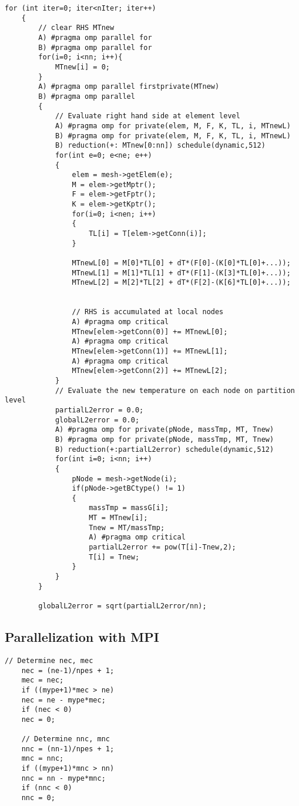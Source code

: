\begin{lstlisting}[caption={\label{Code:OpenMP} Parallelization of two most time consuming loops with implementation A and B}]
	for (int iter=0; iter<nIter; iter++)
	{
		// clear RHS MTnew
		A) #pragma omp parallel for
		B) #pragma omp parallel for
		for(i=0; i<nn; i++){
			MTnew[i] = 0;
		}
		A) #pragma omp parallel firstprivate(MTnew)
		B) #pragma omp parallel
		{
			// Evaluate right hand side at element level
			A) #pragma omp for private(elem, M, F, K, TL, i, MTnewL)
			B) #pragma omp for private(elem, M, F, K, TL, i, MTnewL) 
			B) reduction(+: MTnew[0:nn]) schedule(dynamic,512)
			for(int e=0; e<ne; e++)
			{
				elem = mesh->getElem(e);
				M = elem->getMptr();
				F = elem->getFptr();
				K = elem->getKptr();
				for(i=0; i<nen; i++)
				{
					TL[i] = T[elem->getConn(i)];
				}
				
				MTnewL[0] = M[0]*TL[0] + dT*(F[0]-(K[0]*TL[0]+...));
				MTnewL[1] = M[1]*TL[1] + dT*(F[1]-(K[3]*TL[0]+...));
				MTnewL[2] = M[2]*TL[2] + dT*(F[2]-(K[6]*TL[0]+...));
				
				
				// RHS is accumulated at local nodes
				A) #pragma omp critical
				MTnew[elem->getConn(0)] += MTnewL[0];
				A) #pragma omp critical
				MTnew[elem->getConn(1)] += MTnewL[1];
				A) #pragma omp critical
				MTnew[elem->getConn(2)] += MTnewL[2];
			}
			// Evaluate the new temperature on each node on partition level
			partialL2error = 0.0;
			globalL2error = 0.0;
			A) #pragma omp for private(pNode, massTmp, MT, Tnew)
			B) #pragma omp for private(pNode, massTmp, MT, Tnew) 
			B) reduction(+:partialL2error) schedule(dynamic,512)
			for(int i=0; i<nn; i++)
			{
				pNode = mesh->getNode(i);
				if(pNode->getBCtype() != 1)
				{
					massTmp = massG[i];
					MT = MTnew[i];
					Tnew = MT/massTmp;
					A) #pragma omp critical
					partialL2error += pow(T[i]-Tnew,2);
					T[i] = Tnew;
				}
			}
		}
		
		globalL2error = sqrt(partialL2error/nn);
\end{lstlisting}

\subsection{Parallelization with MPI}

\begin{lstlisting}[caption={\label{Code:MPI1} Determination of number elements on current rank and number nodes in current}]
	// Determine nec, mec
	nec = (ne-1)/npes + 1;
	mec = nec;
	if ((mype+1)*mec > ne)
	nec = ne - mype*mec;
	if (nec < 0)
	nec = 0;
	
	// Determine nnc, mnc
	nnc = (nn-1)/npes + 1;
	mnc = nnc;
	if ((mype+1)*mnc > nn)
	nnc = nn - mype*mnc;
	if (nnc < 0)
	nnc = 0;
\end{lstlisting}

